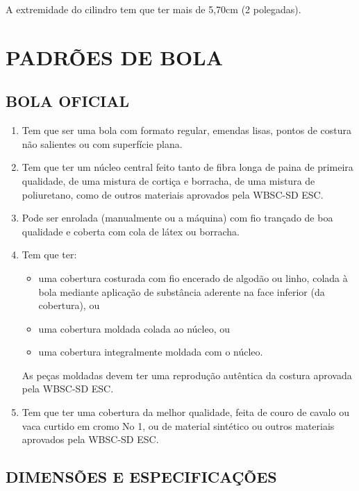 A extremidade do cilindro tem que ter mais de 5,70cm (2 \textonequarter{}  polegadas).

\chapter{PADRÕES DE BOLA}
\minitoc%

\section{BOLA OFICIAL}

\begin{enumerate}[label=(\arabic*)]
	\item   Tem que ser uma bola com formato regular, emendas lisas, pontos de costura não salientes ou com superfície plana.
	\item  Tem que ter um núcleo central feito tanto de fibra longa de paina de primeira qualidade, de uma mistura de cortiça e borracha, de uma mistura de poliuretano, como de outros materiais aprovados pela WBSC-SD \gls{ESC}.
	\item  Pode ser enrolada (manualmente ou a máquina) com fio trançado de boa qualidade e coberta com cola de látex ou borracha.
	\item  Tem que ter:
	\begin{itemize}
		\item 	uma cobertura costurada com fio encerado de algodão ou linho, colada à bola mediante aplicação de substância aderente na face inferior (da cobertura), ou
		\item uma cobertura moldada colada ao núcleo, ou
		\item uma cobertura integralmente moldada com o núcleo.
	\end{itemize}


	As peças moldadas devem ter uma reprodução autêntica da costura aprovada pela WBSC-SD \gls{ESC}.
	\item  Tem que ter uma cobertura da melhor qualidade, feita de couro de cavalo ou vaca curtido em cromo No 1, ou de material sintético ou outros materiais aprovados pela WBSC-SD \gls{ESC}.
\end{enumerate}

\section{DIMENSÕES E ESPECIFICAÇÕES}

